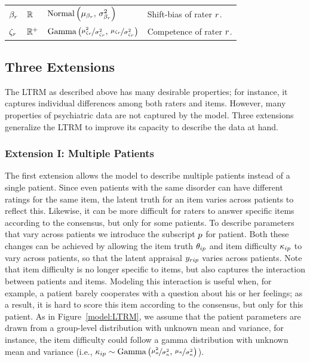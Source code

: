 \documentclass[a4paper,usenames,dvipsnames]{article}
\newenvironment{revision}{\color{black}}{\color{black}}
\newenvironment{revisionN}{\color{black}}{\color{black}}
\begin{document}
\begin{revision}
\begin{table}[!ht]
\begin{tabular}{llll}
	$\beta_r      		$&$	\mathbb{R}			$&$\text{Normal}\left(\mu_{\beta_r},\,\sigma_{\beta_r}^2\right) $&
	Shift-bias of rater $r$.\\

	$\zeta_r 		$&$	\mathbb{R}^+	$&$\text{Gamma}\left(\nicefrac{\mu_{\zeta_r}^2}{\sigma_{\zeta_r}^2},\,\nicefrac{\mu_{\zeta_r}}{\sigma_{\zeta_r}^2}\right) $&
	Competence of rater $r$.\\

	\bottomrule

	\end{tabular}

\end{table}

\protect\end{revision}


\subsection*{Three Extensions}

The LTRM as described above has many desirable properties; for instance, it captures individual differences among both raters and items. However, many properties of psychiatric data are not captured by the model. Three extensions generalize the LTRM to improve its capacity to describe the data at hand.

\subsubsection*{Extension I: Multiple Patients}
The first extension allows the model to describe multiple patients instead of a single patient. Since even patients with the same disorder can have different \begin{revisionN}ratings for the same item\end{revisionN}, the latent truth for an item varies across patients to reflect this. \protect\begin{revision}Likewise, it can be\protect\end{revision} more difficult for raters to answer specific items according to the consensus, but only for some patients. To describe parameters that vary across patients we introduce the subscript $p$ for patient. Both these changes can be achieved by allowing the item truth $\theta_{ip}$ and item difficulty $\kappa_{ip}$ to vary across patients, so that the latent appraisal $y_{rip}$ varies across patients. Note that item difficulty is no longer specific to items, but also captures the interaction between patients and items. Modeling this interaction is useful when, for example, a patient barely cooperates with a question about his or her feelings; as a result, it is hard to score this item according to the consensus, but only for this patient. As in Figure~\ref{model:LTRM}, we assume that the patient parameters are drawn from a group-level distribution with unknown mean and variance, for instance, the item difficulty could follow a gamma distribution with unknown mean and variance (i.e., $\kappa_{ip} \sim \text{Gamma}\left(\nicefrac{\mu_\kappa^2}{\sigma_\kappa^2},\,\nicefrac{\mu_\kappa}{\sigma_\kappa^2}\right)$).
\end{document}
